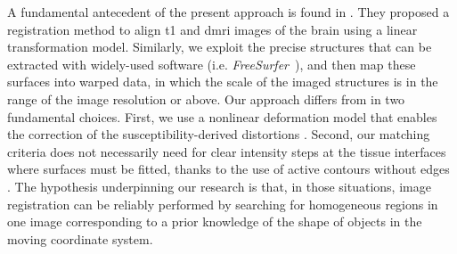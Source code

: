 A fundamental antecedent of the present approach is found in \citep{greve_accurate_2009}.
They proposed a registration method to align \gls*{t1} and \gls*{dmri} images
  of the brain using a linear transformation model.
Similarly, we exploit the precise structures that can be extracted with
  widely-used software (i.e. \emph{FreeSurfer}~\citep{fischl_freesurfer_2012}),
  and then map these surfaces into warped data, in which the scale of the
  imaged structures is in the range of the image resolution or above.
Our approach differs from \citep{greve_accurate_2009} in two fundamental choices.
First, we use a nonlinear deformation model that enables the correction of the
  susceptibility-derived distortions \citep{jezzard_correction_1995}.
Second, our matching criteria does not necessarily need for clear intensity
  steps at the tissue interfaces where surfaces must be fitted, thanks to the use of
  active contours without edges \citep{chan_active_2001}.
The hypothesis underpinning our research is that, in those situations,
  image registration can be reliably performed by searching for homogeneous
  regions in one image corresponding to a prior knowledge of the shape of objects in
  the moving coordinate system.
